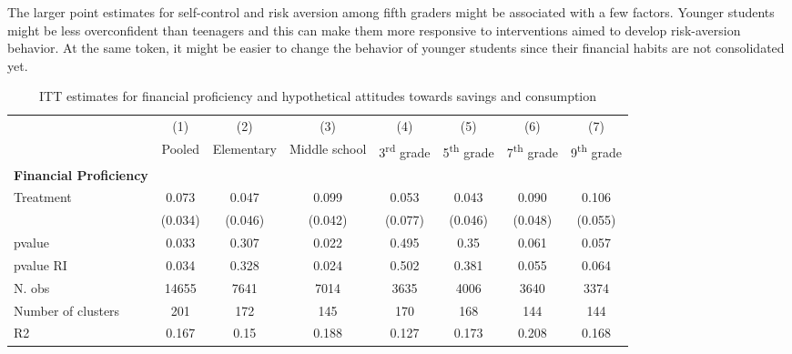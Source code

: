 The larger point estimates for self-control and risk aversion among fifth graders might be associated with a few factors. Younger students might be less overconfident than teenagers and this can make them more responsive to interventions aimed to develop risk-aversion behavior. At the same token, it might be easier to change the behavior of younger students since their financial habits are not consolidated yet.  


\vspace{1cm}
\begin{table}[h!]
\centering
\fontsize{9}{10} \selectfont
\caption{ITT estimates for financial proficiency and hypothetical attitudes towards savings and consumption}
    \begin{tabular}{lccccccc}
    \toprule
    \toprule
          & (1)   & (2)   & (3)   & (4)   & (5)   & (6)   & (7) \\
          & Pooled & Elementary  & Middle school & 3\textsuperscript{rd} grade & 5\textsuperscript{th} grade & 7\textsuperscript{th} grade & 9\textsuperscript{th} grade \\
    \midrule
    \textbf{Financial Proficiency} &       &       &       &       &       &       &  \\
   
 Treatment &    0.073 &      0.047 &    0.099 &      0.053 &      0.043 &     0.090 &     0.106 \\

           &    (0.034) &    (0.046) &    (0.042) &    (0.077) &    (0.046) &    (0.048) &    (0.055) \\

    pvalue &      0.033 &      0.307 &      0.022 &      0.495 &       0.35 &      0.061 &      0.057 \\

 pvalue RI &      0.034 &      0.328 &      0.024 &      0.502 &      0.381 &      0.055 &      0.064 \\

    N. obs &      14655 &       7641 &       7014 &       3635 &       4006 &       3640 &       3374 \\

Number of clusters &        201 &        172 &        145 &        170 &        168 &        144 &        144 \\

        R2 &      0.167 &       0.15 &      0.188 &      0.127 &      0.173 &      0.208 &      0.168 \\



\end{tabular}
\end{table}
